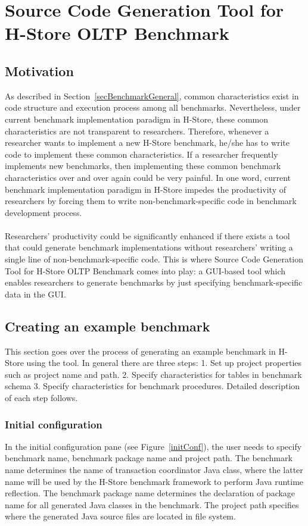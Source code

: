 \documentclass[a4paper,10pt]{article}
\newcommand{\system} {Source Code Generation Tool for H-Store OLTP Benchmark }
\begin{document}
\section{\system}
\label{secGenerator}
\subsection{Motivation}
As described in Section~\ref{secBenchmarkGeneral}, common characteristics exist in code structure and execution process among all benchmarks. Nevertheless, under current benchmark implementation paradigm in H-Store, these common characteristics are not transparent to researchers. Therefore, whenever a researcher wants to implement a new H-Store benchmark, he/she has to write code to implement these common characteristics. If a researcher frequently implements new benchmarks, then implementing these common benchmark characteristics over and over again could be very painful. In one word, current benchmark implementation paradigm in H-Store impedes the productivity of researchers by forcing them to write non-benchmark-specific code in benchmark development process. 
\\\\
Researchers' productivity could be significantly enhanced if there exists a tool that could generate benchmark implementations without researchers' writing a single line of non-benchmark-specific code. This is where \system comes into play: a GUI-based tool which enables researchers to generate benchmarks by just specifying benchmark-specific data in the GUI.

\subsection{Creating an example benchmark}
\label{helloWorld}
This section goes over the process of generating an example benchmark in H-Store using the tool. In general there are three steps: 1. Set up project properties such as project name and path. 2. Specify characteristics for tables in benchmark schema 3. Specify characteristics for benchmark procedures. Detailed description of each step follows.

\subsubsection{Initial configuration}
In the initial configuration pane (see Figure~\ref{initConf}), the user needs to specify benchmark name, benchmark package name and project path. The benchmark name determines the name of transaction coordinator Java class, where the latter name will be used by the H-Store benchmark framework to perform Java runtime reflection. The benchmark package name determines the declaration of package name for all generated Java classes in the benchmark. The project path specifies where the generated Java source files are located in file system.  
\end{document}
